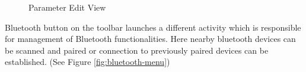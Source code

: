 \begin{figure}
	\centering
	\caption{Parameter Edit View}
	\label{fig:param-edit}
\end{figure}
 
Bluetooth button on the toolbar launches a different activity which is responsible for management of Bluetooth functionalities. Here nearby bluetooth devices can be scanned and paired or connection to previously paired devices can be established. (See Figure \ref{fig:bluetooth-menu})

